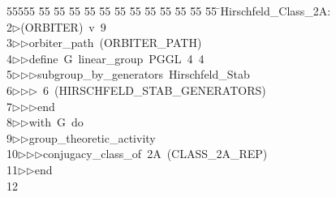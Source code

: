 %
%
\begin{tabbing}
55555 \= 55 \= 55 \= 55 \= 55 \= 55 \= 55 \= 55 \= 55 \= 55 \= 55 \= 55 \= 55 \= \>Hirschfeld\_Class\_2A:\\[0pt]
2\>$\triangleright$\>(ORBITER)\ v\ 9\ \\[0pt]
3\>$\triangleright$\>$\triangleright$\>orbiter\_path\ (ORBITER\_PATH)\ \\[0pt]
4\>$\triangleright$\>$\triangleright$\>define\ G\ linear\_group\ PGGL\ 4\ 4\ \\[0pt]
5\>$\triangleright$\>$\triangleright$\>$\triangleright$\>subgroup\_by\_generators\ Hirschfeld\_Stab\ \\[0pt]
6\>$\triangleright$\>$\triangleright$\>$\triangleright$\ 6\ (HIRSCHFELD\_STAB\_GENERATORS)\ \\[0pt]
7\>$\triangleright$\>$\triangleright$\>$\triangleright$\>end\ \\[0pt]
8\>$\triangleright$\>$\triangleright$\>with\ G\ do\ \\[0pt]
9\>$\triangleright$\>$\triangleright$\>group\_theoretic\_activity\ \\[0pt]
10\>$\triangleright$\>$\triangleright$\>$\triangleright$\>conjugacy\_class\_of\ 2A\ (CLASS\_2A\_REP)\ \\[0pt]
11\>$\triangleright$\>$\triangleright$\>end\\[0pt]
12\>\end{tabbing}
